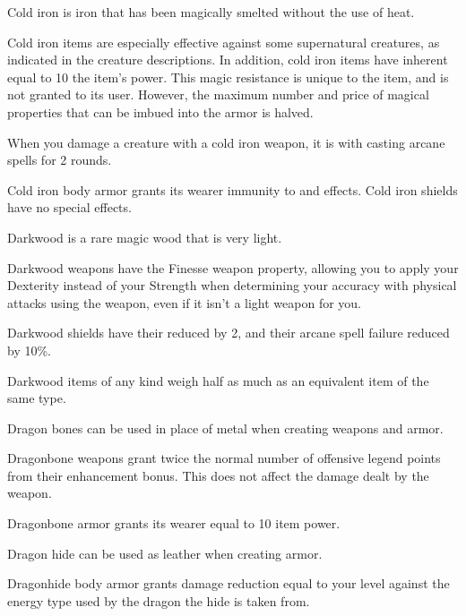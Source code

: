 
        Cold iron is iron that has been magically smelted without the use of heat.

        Cold iron items are especially effective against some supernatural creatures, as indicated in the creature descriptions.
        In addition, cold iron items have inherent  equal to 10 \add the item's power.
        This magic resistance is unique to the item, and is not granted to its user.
        However, the maximum number and price of magical properties that can be imbued into the armor is halved.

        When you damage a creature with a cold iron weapon, it is \impaired with casting arcane spells for 2 rounds.

        Cold iron body armor grants its wearer immunity to  and  effects.
        Cold iron shields have no special effects.

        Darkwood is a rare magic wood that is very light.

        Darkwood weapons have the Finesse weapon property, allowing you to apply your Dexterity instead of your Strength when determining your accuracy with physical attacks using the weapon, even if it isn't a light weapon for you.

        Darkwood shields have their  reduced by 2, and their arcane spell failure reduced by 10\%.

        Darkwood items of any kind weigh half as much as an equivalent item of the same type.


        Dragon bones can be used in place of metal when creating weapons and armor.

        Dragonbone weapons grant twice the normal number of offensive legend points from their enhancement bonus.
        This does not affect the damage dealt by the weapon.

        Dragonbone armor grants its wearer  equal to 10 \add item power.


        Dragon hide can be used as leather when creating armor.

        Dragonhide body armor grants damage reduction equal to your level against the energy type used by the dragon the hide is taken from.

